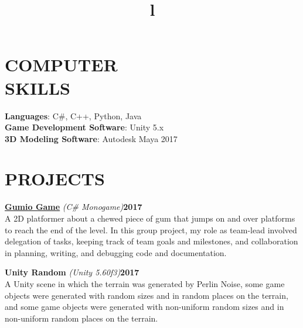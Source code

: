 \documentclass[line,margin]{res}
\begin{document}
\begin{resume}
\section{COMPUTER\\SKILLS}
\textbf{Languages}: C\#, C++, Python, Java\\
\textbf{Game Development Software}: Unity 5.x\\
\textbf{3D Modeling Software}: Autodesk Maya 2017
\section{PROJECTS}
\par
    \href{https://github.com/MaeveMonster/GumioGame}{\textbf{Gumio Game}}
    {\sl (C\# Monogame)}\hfill \textbf{2017}\\ 
    A 2D platformer about a chewed piece of gum that jumps on and over platforms to 
	reach the end of the level. In this group project, my role as team-lead involved delegation of tasks, keeping track of team goals and milestones, and collaboration in planning, writing, and debugging code and documentation.
	
	\par
    {\textbf{Unity Random}}
    {\sl (Unity 5.60f3)}\hfill \textbf{2017}\\ 
    A Unity scene in which the terrain was generated by Perlin Noise, some game objects were generated with random sizes and in random places on the terrain, and some game objects were generated with non-uniform random sizes and in non-uniform random places on the terrain.


\begin{format}
\title{l}\\
\\
\body\\
\end{format}

\end{resume}
\end{document}
